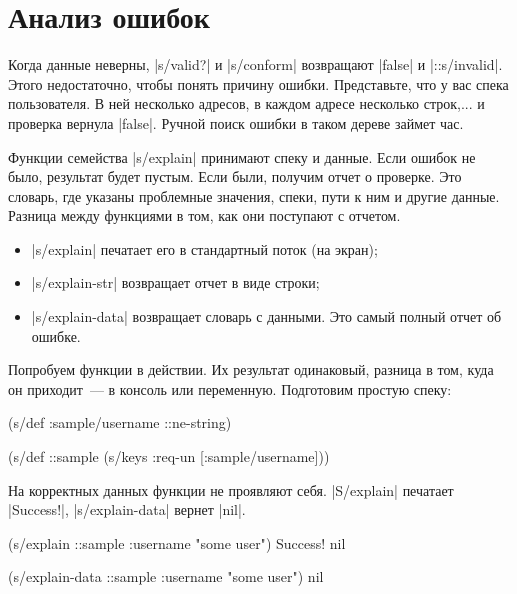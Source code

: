 \section{Анализ ошибок}

Когда данные неверны, \spverb|s/valid?| и \spverb|s/conform| возвращают
\spverb|false| и \spverb|::s/invalid|. Этого недостаточно, чтобы понять причину
ошибки. Представьте, что у вас спека пользователя. В ней несколько адресов, в
каждом адресе несколько строк,... и проверка вернула \spverb|false|. Ручной
поиск ошибки в таком дереве займет час.

Функции семейства \spverb|s/explain| принимают спеку и данные. Если ошибок не
было, результат будет пустым. Если были, получим отчет о проверке. Это словарь,
где указаны проблемные значения, спеки, пути к ним и другие данные. Разница
между функциями в том, как они поступают с отчетом.

\begin{itemize}

\item
  \spverb|s/explain| печатает его в стандартный поток (на экран);

\item
  \spverb|s/explain-str| возвращает отчет в виде строки;

\item
  \spverb|s/explain-data| возвращает словарь с данными. Это самый полный отчет
  об ошибке.

\end{itemize}

Попробуем функции в действии. Их результат одинаковый, разница в том, куда он
приходит~--- в консоль или переменную. Подготовим простую спеку:

\begin{english}
  \begin{clojure}
(s/def :sample/username ::ne-string)

(s/def ::sample
  (s/keys :req-un [:sample/username]))
  \end{clojure}
\end{english}

На корректных данных функции не проявляют себя. \spverb|S/explain| печатает
\spverb|Success!|, \spverb|s/explain-data| вернет \spverb|nil|.

\begin{english}
  \begin{clojure}
(s/explain ::sample {:username "some user"})
Success!
nil

(s/explain-data ::sample {:username "some user"})
nil
  \end{clojure}
\end{english}

